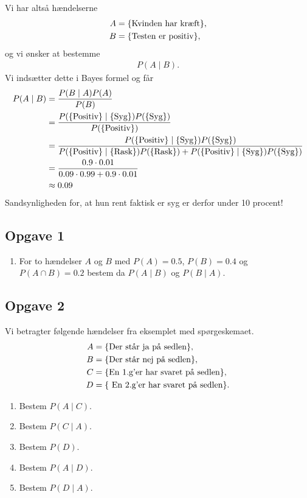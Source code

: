 Vi har altså hændelserne 
\begin{align*}
	A &= \{\textnormal{Kvinden har kræft}\}, \\
	B &= \{\textnormal{Testen er positiv}\},
\end{align*}
og vi ønsker at bestemme
\begin{align*}
	P(A \mid B).
\end{align*}
Vi indsætter dette i Bayes formel og får
\begin{align*}
	P(A \mid B) &= \frac{P(B \mid A)P(A)}{P(B)} \\
	&= \frac{P(\{\textnormal{Positiv} \} \mid \{\textnormal{Syg}\})P(\{\textnormal{Syg}\})}{P(\{\textnormal{Positiv}\})} \\
	&= \frac{P(\{\textnormal{Positiv} \} \mid \{\textnormal{Syg}\})P(\{\textnormal{Syg}\})}{P(\{\textnormal{Positiv} \} \mid \{\textnormal{Rask}\})P(\{\textnormal{Rask}\}) + P(\{\textnormal{Positiv} \} \mid \{\textnormal{Syg}\})P(\{\textnormal{Syg}\})} \\
	&= \frac{0.9 \cdot 0.01}{0.09\cdot 0.99 + 0.9\cdot 0.01} \\
	&\approx 0.09
\end{align*}
Sandsynligheden for, at hun rent faktisk er syg er derfor under 10 procent!



\subsection*{Opgave 1}
\begin{enumerate}[label=\roman*)]
	\item For to hændelser $A$ og $B$ med $P(A) = 0.5$, $P(B) = 0.4$ og $P(A \cap B) = 0.2$ bestem da $P(A \mid B)$ og $P(B \mid A)$.
\end{enumerate}

\subsection*{Opgave 2}
Vi betragter følgende hændelser fra eksemplet med spørgeskemaet. 
\begin{align*}
	A &= \{\textnormal{Der står ja på sedlen}\}, \\
	B &= \{\textnormal{Der står nej på sedlen}\}, \\
	C &= \{\textnormal{En 1.g'er har svaret på sedlen}\}, \\
	D &= \{\textnormal{ En 2.g'er har svaret på sedlen}\}. 
\end{align*}
\begin{enumerate}[label=\roman*)]
	\item Bestem $P(A \mid C)$.
	\item Bestem $P(C \mid A)$.
	\item Bestem $P(D)$.
	\item Bestem $P(A \mid D)$.
	\item Bestem $P(D \mid A)$.
\end{enumerate}

